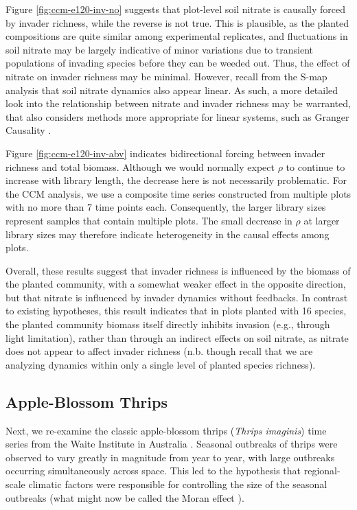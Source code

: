 \documentclass[article]{jss}
\begin{document}
Figure \ref{fig:ccm-e120-inv-no} suggests that plot-level soil nitrate is causally forced by invader richness, while the reverse is not true. This is plausible, as the planted compositions are quite similar among experimental replicates, and fluctuations in soil nitrate may be largely indicative of minor variations due to transient populations of invading species before they can be weeded out. Thus, the effect of nitrate on invader richness may be minimal. However, recall from the S-map analysis that soil nitrate dynamics also appear linear. As such, a more detailed look into the relationship between nitrate and invader richness may be warranted, that also considers methods more appropriate for linear systems, such as Granger Causality \citep{Granger_1969}.

Figure \ref{fig:ccm-e120-inv-abv} indicates bidirectional forcing between invader richness and total biomass. Although we would normally expect $\rho$ to continue to increase with library length, the decrease here is not necessarily problematic. For the CCM analysis, we use a composite time series constructed from multiple plots with no more than 7 time points each. Consequently, the larger library sizes represent samples that contain multiple plots. The small decrease in $\rho$ at larger library sizes may therefore indicate heterogeneity in the causal effects among plots.

Overall, these results suggest that invader richness is influenced by the biomass of the planted community, with a somewhat weaker effect in the opposite direction, but that nitrate is influenced by invader dynamics without feedbacks. In contrast to existing hypotheses, this result indicates that in plots planted with 16 species, the planted community biomass itself directly inhibits invasion (e.g., through light limitation), rather than through an indirect effects on soil nitrate, as nitrate does not appear to affect invader richness (n.b. though recall that we are analyzing dynamics within only a single level of planted species richness).

\subsection{Apple-Blossom Thrips}\label{sec:thrips}

Next, we re-examine the classic apple-blossom thrips (\emph{Thrips imaginis}) time series from the Waite Institute in Australia \citep{Davidson_1948, Davidson_1948a}. Seasonal outbreaks of thrips were observed to vary greatly in magnitude from year to year, with large outbreaks occurring simultaneously across space. This led to the hypothesis that regional-scale climatic factors were responsible for controlling the size of the seasonal outbreaks (what might now be called the Moran effect \citep{Moran_1953}).
\end{document}
